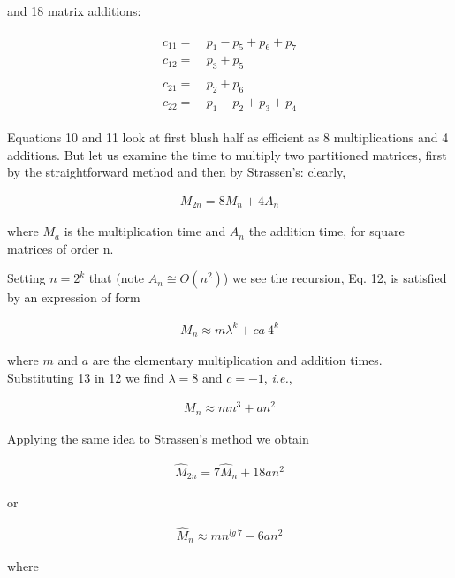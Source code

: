 and 18 matrix additions:

\begin{align}
\begin{split}
    c_{11} =&\ p_{1} - p_{5} + p_{6} + p_{7}    \\
    c_{12} =&\ p_{3} + p_{5}                    \\
                                                \\
    c_{21} =&\ p_{2} + p_{6}                    \\
    c_{22} =&\ p_{1} - p_{2} + p_{3} + p_{4}
\end{split}
\end{align}

Equations 10 and 11 look at first blush half as efficient as 8 multiplications and 4 additions. But let us examine the time to multiply two partitioned matrices, first by the straightforward method and then by Strassen's: clearly,

\begin{align}
    M_{2n} = 8M_{n} + 4A_{n}
\end{align}

where $M_{a}$ is the multiplication time and $A_{n}$ the addition time, for square matrices of order n.

Setting $n = 2^{k}$ that (note $A_{n} \cong O(n^{2})$) we see the recursion, Eq. 12, is satisfied by an expression of form

\begin{align}
    M_{n} \approx m\lambda^{k} + ca\ 4^{k}
\end{align}

where $m$ and $a$ are the elementary multiplication and addition times. Substituting 13 in 12 we find $\lambda = 8$ and $c = -1$, \textit{i.e.},

\begin{align}
    M_{n} \approx mn^{3} + an^{2}
\end{align}

Applying the same idea to Strassen’s method we obtain

\begin{align}
    \hat{M}_{2n} = 7\hat{M}_{n} + 18an^{2}
\end{align}

or

\begin{align}
    \hat{M}_{n} \approx mn^{lg\ 7} - 6an^{2}
\end{align}

where

